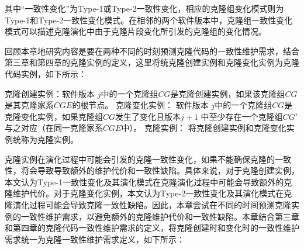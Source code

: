 
其中“一致性变化”为Type-1或Type-2一致性变化，相应的克隆组变化模式则为Type-1和Type-2一致性变化模式。在相邻的两个软件版本中，克隆组一致性变化模式可以描述克隆演化中由于克隆片段变化所引发的克隆组的变化情况。

回顾本章地研究内容是要在两种不同的时刻预测克隆代码的一致性维护需求，结合第三章和第四章的克隆实例的定义，这里将统克隆创建实例和克隆变化实例为克隆代码实例，如下所示：\\

\begin{definition}
\label{def-instance}
克隆创建实例：软件版本 $j$中的一个克隆组$CG$是克隆创建实例，如果该克隆组$CG$是其克隆家系$CGE$的根节点。
克隆变化实例：
软件版本 $j$中的一个克隆组$CG$是克隆变化实例，如果克隆组$CG$发生了变化且版本$j+1$ 中至少存在一个克隆组$CG'$与之对应（在同一克隆家系$CGE$中）。 
克隆实例： 将克隆创建实例和克隆变化实例统称为克隆实例。
\end{definition}



克隆实例在演化过程中可能会引发的克隆一致性变化，如果不能确保克隆的一致性，将会导致导致额外的维护代价和一致性缺陷。具体来说，对于克隆创建实例，本文认为Type-1一致性变化及其演化模式在克隆演化过程中可能会导致额外的克隆维护代价。对于克隆变化实例，本文认为Type-2一致性变化及其演化模式在克隆演化过程可能会导致克隆一致性缺陷。因此，本章尝试在不同的时间预测克隆实例的一致性维护需求，以避免额外的克隆维护代价和一致性缺陷。本章结合第三章和第四章的克隆代码一致性维护需求的定义，将克隆创建时和变化时的一致性维护需求统一为克隆一致性维护需求定义，如下所示：\\

